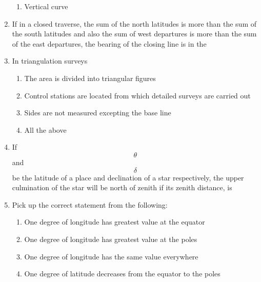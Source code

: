 \documentclass[11pt,a4paper]{article}
\begin{document}
\begin{enumerate}
\begin{enumerate}[label=\Alph*.]
\item{Vertical curve}
\end{enumerate}
\item{If in a closed traverse, the sum of the north latitudes is more than the sum of the south latitudes and also the sum of west departures is more than the sum of the east departures, the bearing of the closing line is in the}
\\
\item{In triangulation surveys}
\begin{enumerate}[label=\Alph*.]
\item{The area is divided into triangular figures}
\item{Control stations are located from which detailed surveys are carried out}
\item{Sides are not measured excepting the base line}
\item{All the above}
\end{enumerate}
\item{If $$\theta $$ and $$\delta $$ be the latitude of a place and declination of a star respectively, the upper culmination of the star will be north of zenith if its zenith distance, is
}
\\
\item{Pick up the correct statement from the following:}
\begin{enumerate}[label=\Alph*.]
\item{One degree of longitude has greatest value at the equator}
\item{One degree of longitude has greatest value at the poles}
\item{One degree of longitude has the same value everywhere}
\item{One degree of latitude decreases from the equator to the poles}

\end{enumerate}
\end{enumerate}
\end{document}
